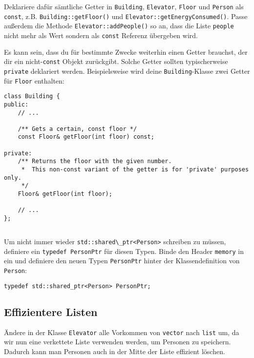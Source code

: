 Deklariere dafür sämtliche Getter in \lstinline{Building}, \lstinline{Elevator}, \lstinline{Floor} und \lstinline{Person} als \lstinline{const}, z.B. \lstinline{Building::getFloor()} und \lstinline{Elevator::getEnergyConsumed()}.
Passe außerdem die Methode \lstinline{Elevator::addPeople()} so an, dass die Liste \lstinline{people} nicht mehr als Wert sondern als \lstinline{const} Referenz übergeben wird.

Es kann sein, dass du für bestimmte Zwecke weiterhin einen Getter brauchst, der dir ein nicht-\lstinline{const} Objekt zurückgibt.
Solche Getter sollten typischerweise \lstinline{private} deklariert werden.
Beispielsweise wird deine \lstinline{Building}-Klasse zwei Getter für \lstinline{Floor} enthalten:
\begin{lstlisting}
class Building {
public:
    // ...

    /** Gets a certain, const floor */
    const Floor& getFloor(int floor) const;

private:
    /** Returns the floor with the given number. 
     *  This non-const variant of the getter is for 'private' purposes only. 
     */
    Floor& getFloor(int floor);

    // ...
};
\end{lstlisting}


\subsection{}
Um nicht immer wieder \lstinline{std::shared\_ptr<Person>} schreiben zu müssen, definiere ein \lstinline{typedef PersonPtr} für diesen Typen.
Binde den Header \lstinline{memory} in  ein und definiere den neuen Typen \lstinline{PersonPtr} hinter der Klassendefinition von \lstinline{Person}:

\begin{lstlisting}
typedef std::shared_ptr<Person> PersonPtr;
\end{lstlisting}

\subsection{Effizientere Listen}
Ändere in der Klasse \lstinline{Elevator} alle Vorkommen von \lstinline{vector} nach \lstinline{list} um, da wir nun eine verkettete Liste verwenden werden, um Personen zu speichern.
Dadurch kann man Personen auch in der Mitte der Liste effizient löschen.

